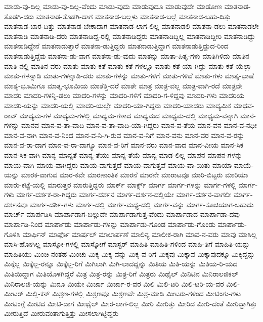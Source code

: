 {ಮಾಡು-ವು-ದಿಲ್ಲ
ಮಾಡು-ವು-ದಿಲ್ಲ-ವೆಂದು
ಮಾಡು-ವುದು
ಮಾಡುವುದೂ
ಮಾಡುವುದೇ
ಮಾಡೋಣ
ಮಾತನಾಡ-ತೊಡಗಿ-ದರು
ಮಾತನಾಡ-ತೊಡಗಿ-ದಾಗ
ಮಾತನಾಡ-ಬಲ್ಲಳು
ಮಾತನಾಡ-ಬಲ್ಲೆ
ಮಾತನಾಡ-ಬಹು-ದಿತ್ತು
ಮಾತನಾಡ-ಬಾರ-ದಿತ್ತು
ಮಾತನಾಡ-ಬೇಕಾದಾಗ
ಮಾತನಾಡ-ಲಾಗ-ಲಿಲ್ಲ
ಮಾತನಾಡಲಿ
ಮಾತನಾ-ಡಲು
ಮಾತನಾಡಲೇ
ಮಾತನಾಡಿ
ಮಾತನಾಡಿ-ದರು
ಮಾತನಾಡಿದ್ದ-ರಲ್ಲಿ
ಮಾತನಾಡಿದ್ದರು
ಮಾತನಾಡಿದ್ದಿಲ್ಲ
ಮಾತನಾಡಿದ್ದೀರಿ
ಮಾತನಾಡಿದ್ದು
ಮಾತನಾಡಿದ್ದೇನೆ
ಮಾತನಾಡುತ್ತಾರೆ
ಮಾತನಾ-ಡುತ್ತಿದ್ದರು
ಮಾತನಾಡುತ್ತಿದ್ದಾಗ
ಮಾತನಾಡುತ್ತಿದ್ದುದ-ರಿಂದ
ಮಾತನಾಡುತ್ತಿದ್ದೆವು
ಮಾತನಾ-ಡು-ವಾಗ
ಮಾತನಾ-ಡು-ವುದು
ಮಾತನ್ನು
ಮಾತಾ-ಪಿತೃ-ಗಳು
ಮಾತಿಗಿಳಿದು
ಮಾತಿನ
ಮಾತಿ-ನಲ್ಲಿ
ಮಾತಿನ-ವರು
ಮಾತು
ಮಾತು-ಕತೆ
ಮಾತು-ಕತೆ-ಗಳಲ್ಲೂ
ಮಾತು-ಕತೆ-ಯಾ-ಗಿದ್ದು
ಮಾತು-ಕತೆ-ಯೆಲ್ಲಾ
ಮಾತು-ಗಳನ್ನಾಡಿ
ಮಾತು-ಗಳನ್ನಾಡಿ-ದರು
ಮಾತು-ಗಳನ್ನು
ಮಾತು-ಗಳಿಗೆ
ಮಾತು-ಗಳಿವೆ
ಮಾತು-ಗಳು
ಮಾತೃ-ಭಾಷೆ
ಮಾತೃ-ಭೂಮಿಗೂ
ಮಾತೃ-ಭೂಮಿಯ
ಮಾತೆತ್ತಿ-ದರೆ
ಮಾತೇ
ಮಾತ್ರ
ಮಾತ್ರ-ವಲ್ಲ
ಮಾತ್ರ-ವಾಗಿ-ರದೆ
ಮಾತ್ರವೇ
ಮಾದರಿ
ಮಾದರಿ-ಗಳನ್ನಿ-ಡಲು
ಮಾದರಿ-ಗಳನ್ನು
ಮಾದರಿ-ಗಳಿಗೆ
ಮಾದರಿ-ಗ-ಳಿದ್ದವು
ಮಾದರಿ-ಗಳು
ಮಾದರಿಯ
ಮಾದರಿ-ಯನ್ನು
ಮಾದರಿ-ಯಲ್ಲಿ
ಮಾದರಿ-ಯಲ್ಲೇ
ಮಾದರಿ-ಯಾ-ಗಿದ್ದರು
ಮಾದರಿ-ಯಾದರು
ಮಾದ್ಯಮಿಕ
ಮಾಧವ-ರಾವ್
ಮಾಧ್ಯಮ-ಗಳ
ಮಾಧ್ಯಮ-ಗಳಲ್ಲಿ
ಮಾಧ್ಯಮ-ಗಳಾದ
ಮಾಧ್ಯಮದ
ಮಾಧ್ಯಮ-ದಲ್ಲಿ
ಮಾಧ್ಯಮ-ವನ್ನಾಗಿ
ಮಾನ-ಗಳನ್ನು
ಮಾನವ
ಮಾನ-ವ-ತಾ-ವಾದಿ
ಮಾನ-ವ-ತಾ-ವಾದಿ-ಯಾ-ಗಿದ್ದರು
ಮಾನ-ವ-ತೆಯ
ಮಾನ-ವನ
ಮಾನ-ವ-ನಧೀ
ಮಾನ-ವ-ನಾಗಿ
ಮಾನ-ವ-ನಿಂದ
ಮಾನ-ವ-ನಿ-ಗಿ-ರುವ
ಮಾನ-ವ-ನಿಗೆ
ಮಾನ-ವನು
ಮಾನ-ವರ
ಮಾನ-ವ-ರನ್ನು
ಮಾನ-ವ-ರಾ-ದಾಗ
ಮಾನ-ವ-ರಾ-ದಾಗ್ಯೂ
ಮಾನ-ವ-ರಿಗೆ
ಮಾನ-ವರು
ಮಾನ-ವಾದ
ಮಾನ-ವೀಯ
ಮಾನ-ಸಿಕ
ಮಾನ-ಸಿಕ-ವಾಗಿ
ಮಾನ್ಯ
ಮಾನ್ಯತೆ
ಮಾನ್ಯ-ತೆಯು
ಮಾನ್ಯ-ತೆಯೆ
ಮಾನ್ಯ-ಮಾಡ-ಲಿಲ್ಲ
ಮಾಪನ
ಮಾಪನ-ಗಳನ್ನು
ಮಾಯ-ವಾಗಿ
ಮಾಯ-ವಾಗಿದ್ದರು
ಮಾಯ-ವಾಗುತ್ತದೆ
ಮಾಯ-ವಾಗುತ್ತವೆ
ಮಾಯ-ವಾ-ಯಿತು
ಮಾಯಾ
ಮಾಯೆ-ಯನ್ನು
ಮಾರಕ-ವಾಗುವ
ಮಾರ-ಕವೇ
ಮಾರಣಾಂತಿಕ
ಮಾರನೆ
ಮಾರನೇ
ಮಾರಾಟವೂ
ಮಾರಿ-ಬಿಟ್ಟರು
ಮಾರಿಯಾ
ಮಾರು-ಕಟ್ಟೆ-ಯಲ್ಲಿ
ಮಾರುತ್ತರ
ಮಾರುತ್ತಿದ್ದರು
ಮಾರ್ಕ್
ಮಾರ್ಕ್ಸ್
ಮಾರ್ಗ
ಮಾರ್ಗ-ಗಳನ್ನು
ಮಾರ್ಗ-ಗಳಲ್ಲಿ
ಮಾರ್ಗ-ಗಳು
ಮಾರ್ಗ-ದರ್ಶಕ-ರಾ-ಗಿದ್ದರು
ಮಾರ್ಗ-ದರ್ಶನ
ಮಾರ್ಗ-ದರ್ಶನ-ದಲ್ಲಿಯೇ
ಮಾರ್ಗ-ದರ್ಶನ-ವಾಗಲೀ
ಮಾರ್ಗ-ದರ್ಶನವೂ
ಮಾರ್ಗ-ದರ್ಶಿ-ಗಳು
ಮಾರ್ಗ-ದಲ್ಲಿ
ಮಾರ್ಗ-ಮಧ್ಯ-ದಲ್ಲಿ
ಮಾರ್ಗ-ವನ್ನು
ಮಾರ್ಗ-ಸೂಚಿಯಾಗ-ಬಹುದು
ಮಾರ್ಚ್
ಮಾರ್ಪಡಿಸಿ
ಮಾರ್ಪಾಡಾಗ-ಬಲ್ಲುದೇ
ಮಾರ್ಪಾಡಾಗುತ್ತ-ವೆಂದು
ಮಾರ್ಪಾಡಾದ
ಮಾರ್ಪಾಡಾ-ದವು
ಮಾರ್ಪಾಡಿ-ನಿಂದ
ಮಾರ್ಪಾಡು
ಮಾರ್ಪಾಡು-ಗಳನ್ನು
ಮಾರ್ಪಾಡು-ಗೊಂಡ
ಮಾರ್ಪಾಡು-ಗೊಂಡು
ಮಾರ್ಪಾಡು-ಗೊಳಿಸಿ
ಮಾರ್ಫಿನ್
ಮಾರ್ಫೊ
ಮಾರ್ಷಲ್
ಮಾಲಾರ್ಪಣೆ
ಮಾಲಿನ್ಯ
ಮಾಲೀಕ-ರಾಗಿ
ಮಾವ-ನ-ವರು
ಮಾವು
ಮಾಸಿಲ್ಲ
ಮಾಸಿ-ಹೋಗಿಲ್ಲ
ಮಾಸ್ಕೋ-ಗಳಲ್ಲಿ
ಮಾಸ್ಕೋಗೆ
ಮಾಸ್ಟರ್
ಮಾಹಿತಿ
ಮಾಹಿತಿ-ಗಳಿಂದ
ಮಾಹಿ-ತಿಗೆ
ಮಾಹಿತಿ-ಯನ್ನು
ಮಾಹಿತಿಯು
ಮಿಂಚಿ-ನಂತಹ
ಮಿಂಚು
ಮಿಕ್ಕ
ಮಿಕ್ಕ-ವನ್ನು
ಮಿಕ್ಕ-ವ-ರಿಗೆ
ಮಿಕ್ಕವು
ಮಿಕ್ಕಾವ
ಮಿಕ್ಕಾವುದಕ್ಕೂ
ಮಿಕ್ಕಿದ್ದನ್ನು
ಮಿಕ್ಕೆಲ್ಲ
ಮಿಕ್ಕೆಲ್ಲ-ರನ್ನೂ
ಮಿಕ್ಕೆಲ್ಲ-ರಿಗೆ
ಮಿಗಿಲಾಗಿ
ಮಿಗಿ-ಲಾದದ್ದನ್ನು
ಮಿತಿಯ
ಮಿತಿ-ಯನ್ನು
ಮಿತಿಯ-ರಿ-ಯದ
ಮಿತಿಯಿದ್ದಾಗ
ಮಿತಿಯೊಳಗಿದ್ದರೆ
ಮಿತ್ರ
ಮಿತ್ರ-ರನ್ನು
ಮಿತ್ರ-ರಿಗೆ
ಮಿತ್ರರು
ಮಿಥೈಲ್
ಮಿನಿಟಿನ
ಮಿನಿರಾಲಜಿಕಲ್
ಮಿನಿರಾಲಜಿ-ಯನ್ನು
ಮಿನೂ
ಮಿಯೇ
ಮಿರ್ಜಾ
ಮಿರ್ಜಾ-ರ-ವರ
ಮಿಲಿ
ಮಿಲಿ-ಟರಿ
ಮಿಲಿ-ಟರಿ-ಯ-ವರ
ಮಿಲಿ-ಮೀಟರ್
ಮಿಲ್ಲಿ-ಕನ್
ಮಿಶ್ರಣ-ಗಳಲ್ಲಿ
ಮಿಶ್ರಣವೂ
ಮಿಶ್ರಣವೇ
ಮಿಶ್ರ-ಮಾಡಿ
ಮೀಟರು-ಗಳಿಂದ
ಮೀಟಿಂಗು-ಗಳು
ಮೀಟಿಂಗ್ಗೆ
ಮೀಟಿದ
ಮೀಟಿ-ದಾಗ
ಮೀಥೈಲ್
ಮೀರ-ಲಾಗ-ಲಿಲ್ಲ
ಮೀರಿ
ಮೀರಿತ್ತು
ಮೀರಿದ
ಮೀರಿ-ದಂತೆ
ಮೀರಿದ್ದಾಗಿತ್ತು
ಮೀರುತ್ತಿದೆ
ಮೀರುವಂತಾಗುತ್ತಿತ್ತು
ಮೀಸಲಾಗಿಟ್ಟಿದ್ದರು
}
